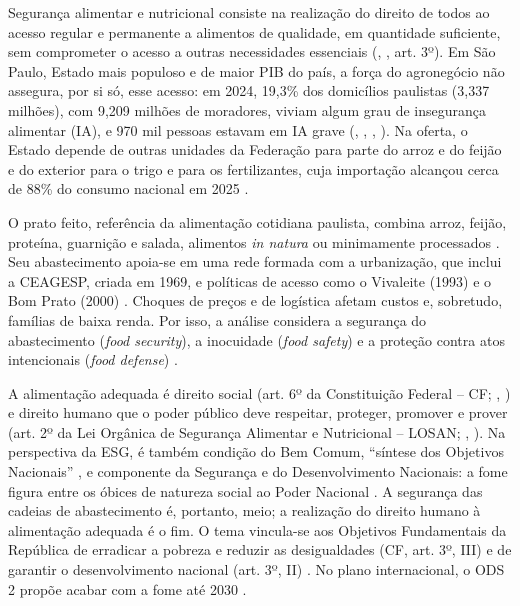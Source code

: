 \documentclass[
	12pt,				%
	openright,			%
	oneside,			%
	a4paper,			%
	chapter=TITLE,		%
	section=TITLE,		%
	english,			%
	french,				%
	spanish,			%
	brazil,				%
 ]{abntex2}
\begin{document}
Segurança alimentar e nutricional consiste na realização do direito de todos
ao acesso regular e permanente a alimentos de qualidade, em quantidade
suficiente, sem comprometer o acesso a outras necessidades essenciais
(\citeauthor{brasil2006b}, \citeyear{brasil2006b}, art. 3º). Em São Paulo, Estado mais
populoso e de maior PIB do país, a força do agronegócio não assegura, por si
só, esse acesso: em 2024, 19,3\% dos domicílios paulistas (3,337 milhões), com
9,209 milhões de moradores, viviam algum grau de insegurança alimentar (IA), e
970 mil pessoas estavam em IA grave
(\citeauthor{ibge_censo2022}, \citeyear{ibge_censo2022}, \citeyear{ibge_contas_regionais}, \citeyear{ibge_pnadc2024a}). Na oferta,
o Estado depende de outras unidades da Federação para parte do arroz e do
feijão e do exterior para o trigo e para os fertilizantes, cuja importação
alcançou cerca de 88\% do consumo nacional em 2025
\cite{iea_sp_2023,cnn_brasil2026,brasil2022fertilizantes}.

O prato feito, referência da alimentação cotidiana paulista, combina arroz,
feijão, proteína, guarnição e salada, alimentos \textit{in natura} ou
minimamente processados \cite{who_healthydiet}. Seu abastecimento
apoia-se em uma rede formada com a urbanização, que inclui a CEAGESP, criada
em 1969, e políticas de acesso como o Vivaleite (1993) e o Bom Prato (2000)
\cite{ceagesp_historico,iea_vivaleite,governo_sp_bomprato2025}.
Choques de preços e de logística afetam custos e, sobretudo, famílias de baixa
renda. Por isso, a análise considera a segurança do abastecimento (\textit{food
security}), a inocuidade (\textit{food safety}) e a proteção contra atos
intencionais (\textit{food defense}) \cite[p. 48]{perez2018}.

A alimentação adequada é direito social (art. 6º da Constituição Federal -- CF;
\citeauthor{brasil1988}, \citeyear{brasil1988}) e direito humano que o poder
público deve respeitar, proteger, promover e prover (art. 2º da Lei Orgânica de
Segurança Alimentar e Nutricional -- LOSAN; \citeauthor{brasil2006b},
\citeyear{brasil2006b}). Na perspectiva da ESG, é também condição do Bem Comum,
``síntese dos Objetivos Nacionais'' \cite[p. 19]{esg_fpn2024}, e componente da
Segurança e do Desenvolvimento Nacionais: a fome figura entre os óbices de
natureza social ao Poder Nacional \cite[p. 42]{esg_fpn2024}. A segurança das
cadeias de abastecimento é, portanto, meio; a realização do direito humano à
alimentação adequada é o fim. O tema vincula-se aos Objetivos Fundamentais da
República de erradicar a pobreza e reduzir as desigualdades (CF, art. 3º, III)
e de garantir o desenvolvimento nacional (art. 3º, II) \cite{brasil1988}. No plano
internacional, o ODS 2 propõe acabar com a fome até 2030
\cite{onu2015,onu_ods2}.
\end{document}
